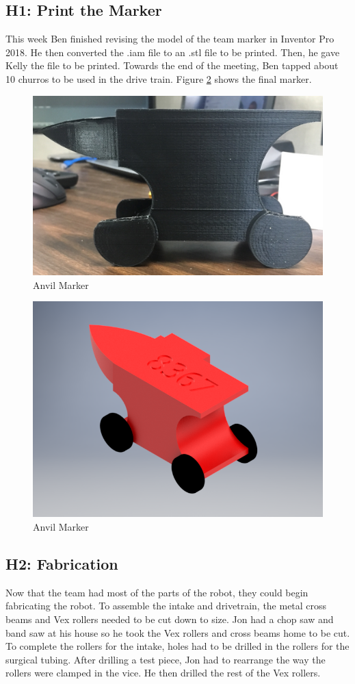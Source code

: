 \documentclass{article}
\begin{document}
\subsection{H1: Print the Marker}

This week Ben finished revising the model of the team marker in Inventor Pro 2018. He then converted the .iam file to an .stl file to be printed. Then, he gave Kelly the file to be printed. Towards the end of the meeting, Ben tapped about 10 churros to be used in the drive train. Figure \ref{fig:marker} shows the final marker. 

\begin{figure}
    \centering
    \includegraphics[width=.6 \textwidth]{09_10-29/images/anvil_marker.jpg}
    \caption{Anvil Marker}
    \label{fig:marker}
\end{figure}

\begin{figure}
    \centering
    \includegraphics[width=.6 \textwidth]{09_10-29/images/REAL_anvil_marker[1].png}
    \caption{Anvil Marker}
    \label{fig:marker}
\end{figure}

\subsection{H2: Fabrication}

Now that the team had most of the parts of the robot, they could begin fabricating the robot. To assemble the intake and drivetrain, the metal cross beams and Vex rollers needed to be cut down to size. Jon had a chop saw and band saw at his house so he took the Vex rollers and cross beams home to be cut. To complete the rollers for the intake, holes had to be drilled in the rollers for the surgical tubing. After drilling a test piece, Jon had to rearrange the way the rollers were clamped in the vice. He then drilled the rest of the Vex rollers.
\end{document}
